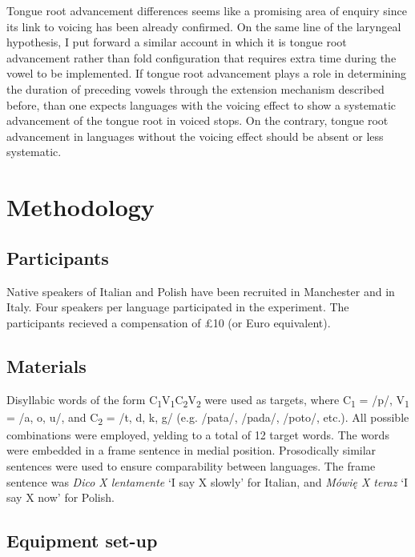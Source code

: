\documentclass[]{elsarticle}
\begin{document}
Tongue root advancement differences seems like a promising area of
enquiry since its link to voicing has been already confirmed. On the
same line of the laryngeal hypothesis, I put forward a similar account
in which it is tongue root advancement rather than fold configuration
that requires extra time during the vowel to be implemented. If tongue
root advancement plays a role in determining the duration of preceding
vowels through the extension mechanism described before, than one
expects languages with the voicing effect to show a systematic
advancement of the tongue root in voiced stops. On the contrary, tongue
root advancement in languages without the voicing effect should be
absent or less systematic.

\section{Methodology}\label{methodology}

\subsection{Participants}\label{participants}

Native speakers of Italian and Polish have been recruited in Manchester
and in Italy. Four speakers per language participated in the experiment.
The participants recieved a compensation of £10 (or Euro equivalent).

\subsection{Materials}\label{materials}

Disyllabic words of the form
C\textsubscript{1}V\textsubscript{1}C\textsubscript{2}V\textsubscript{2}
were used as targets, where C\textsubscript{1} = /p/, V\textsubscript{1}
= /a, o, u/, and C\textsubscript{2} = /t, d, k, g/ (e.g. /pata/, /pada/,
/poto/, etc.). All possible combinations were employed, yelding to a
total of 12 target words. The words were embedded in a frame sentence in
medial position. Prosodically similar sentences were used to ensure
comparability between languages. The frame sentence was \emph{Dico X
lentamente} `I say X slowly' for Italian, and \emph{Mówię X teraz} `I
say X now' for Polish.

\subsection{Equipment set-up}\label{equipment-set-up}
\end{document}

